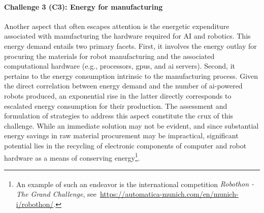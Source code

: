 \documentclass[12pt]{article}
\newcommand\myhl[1]{\textcolor{red}{#1}}
\begin{document}
\paragraph*{\textbf{Challenge 3} (C3): Energy for manufacturing}
Another aspect that often escapes attention is the energetic expenditure associated with manufacturing the hardware required for AI and robotics. This energy demand entails two primary facets. First, it involves the energy outlay for procuring the materials for robot manufacturing and the associated computational hardware (e.g., processors, \ac{gpu}s, and \ac{ai} servers). Second, it pertains to the energy consumption intrinsic to the manufacturing process. Given the direct correlation between energy demand and the number of \ac{ai}-powered robots produced, an exponential rise in the latter directly corresponds to escalated energy consumption for their production. The assessment and formulation of strategies to address this aspect constitute the crux of this challenge. While an immediate solution may not be evident, and since substantial energy savings in raw material procurement may be impractical, significant potential lies in the recycling of electronic components of computer and robot hardware as a means of conserving energy\footnote{An example of such an endeavor is the international competition \textit{Robothon\textsuperscript{\textregistered} - The Grand Challenge}, see~\url{https://automatica-munich.com/en/munich-i/robothon/}.}.

\end{document}
